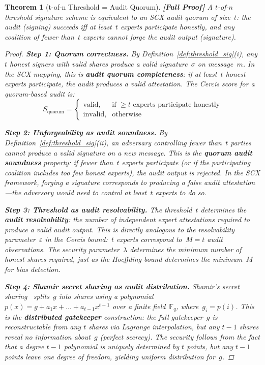 \documentclass[12pt,a4paper]{article}
\newtheorem{theorem}{Theorem}[section]
\theoremstyle{remark}
\newcommand{\Fbb}{\mathbb{F}}
\newcommand{\SCX}{\textsf{SCX}}
\newcommand{\Cercis}{\textsf{Cercis}}
\newcommand{\rigorFull}{\textbf{[Full Proof]}}
\begin{document}
\begin{theorem}[t-of-n Threshold = Audit Quorum]
\label{thm:threshold_quorum}
\rigorFull
A $t$-of-$n$ threshold signature scheme is equivalent to an \SCX{} audit quorum of size~$t$: the audit (signing) succeeds iff at least~$t$ experts participate honestly, and any coalition of fewer than~$t$ experts cannot forge the audit output (signature).

\begin{proof}
\noindent\textbf{Step 1: Quorum correctness.}
By Definition~\ref{def:threshold_sig}(i), any $t$ honest signers with valid shares produce a valid signature~$\sigma$ on message~$m$. In the \SCX{} mapping, this is \textbf{audit quorum completeness}: if at least~$t$ honest experts participate, the audit produces a valid attestation. The \Cercis{} score for a quorum-based audit is:
\begin{equation}
  S_{\text{quorum}} = \begin{cases}
    \text{valid}, & \text{if } \geq t \text{ experts participate honestly}\\
    \text{invalid}, & \text{otherwise}
  \end{cases}
\end{equation}

\smallskip
\noindent\textbf{Step 2: Unforgeability as audit soundness.}
By Definition~\ref{def:threshold_sig}(ii), an adversary controlling fewer than~$t$ parties cannot produce a valid signature on a new message. This is the \textbf{quorum audit soundness} property: if fewer than~$t$ experts participate (or if the participating coalition includes too few honest experts), the audit output is rejected. In the \SCX{} framework, forging a signature corresponds to producing a false audit attestation---the adversary would need to control at least~$t$ experts to do so.

\smallskip
\noindent\textbf{Step 3: Threshold as audit resolvability.}
The threshold~$t$ determines the \textbf{audit resolvability}: the number of independent expert attestations required to produce a valid audit output. This is directly analogous to the resolvability parameter~$\varepsilon$ in the \Cercis{} bound:~$t$ experts correspond to~$M = t$ audit observations. The security parameter~$\lambda$ determines the minimum number of honest shares required, just as the Hoeffding bound determines the minimum~$M$ for bias detection.

\smallskip
\noindent\textbf{Step 4: Shamir secret sharing as audit distribution.}
Shamir's secret sharing~\cite{shamir1979share} splits~$g$ into shares using a polynomial~$p(x) = g + a_1 x + \ldots + a_{t-1} x^{t-1}$ over a finite field~$\Fbb_q$, where~$g_i = p(i)$. This is the \textbf{distributed gatekeeper} construction: the full gatekeeper~$g$ is reconstructable from any $t$ shares via Lagrange interpolation, but any $t-1$ shares reveal no information about~$g$ (perfect secrecy). The security follows from the fact that a degree $t-1$ polynomial is uniquely determined by $t$ points, but any $t-1$ points leave one degree of freedom, yielding uniform distribution for~$g$.
\end{proof}
\end{theorem}
\end{document}
